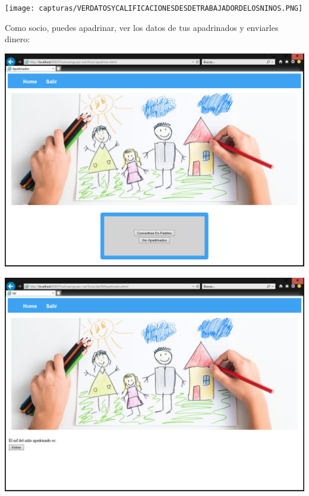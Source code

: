 \documentclass{article}
\begin{document}
\begin{center}
\texttt{[image: capturas/VERDATOSYCALIFICACIONESDESDETRABAJADORDELOSNINOS.PNG]}
\end{center}

Como socio, puedes apadrinar, ver los datos de tus apadrinados y enviarles dinero:

\begin{center}
\includegraphics[scale=0.5]{capturas/APADRINADOS.PNG}
\end{center}

\begin{center}
\includegraphics[scale=0.5]{capturas/NINOAPADRINADO.PNG}
\end{center}
\end{document}
